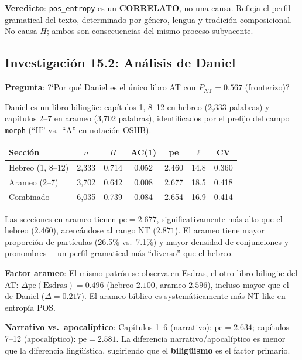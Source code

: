 \documentclass[12pt,a4paper]{article}
\begin{document}
\textbf{Veredicto}: \texttt{pos\_entropy} es un \textbf{CORRELATO}, no una causa.
Refleja el perfil gramatical del texto, determinado por g\'enero, lengua y tradici\'on
composicional. No causa $H$; ambos son consecuencias del mismo proceso subyacente.

\subsection{Investigaci\'on 15.2: An\'alisis de Daniel}

\textbf{Pregunta}: ?`Por qu\'e Daniel es el \'unico libro AT con $P_{\text{AT}} = 0.567$
(fronterizo)?

Daniel es un libro biling\"ue: cap\'itulos 1, 8--12 en hebreo (2,333 palabras)
y cap\'itulos 2--7 en arameo (3,702 palabras), identificados por el prefijo del campo
\texttt{morph} (``H'' vs.\ ``A'' en notaci\'on OSHB).

\begin{center}
\begin{tabular}{lcccccc}
\toprule
\textbf{Secci\'on} & $n$ & $H$ & AC(1) & pe & $\bar{\ell}$ & CV \\
\midrule
Hebreo (1, 8--12) & 2,333 & 0.714 & 0.052 & 2.460 & 14.8 & 0.360 \\
Arameo (2--7)     & 3,702 & 0.642 & 0.008 & 2.677 & 18.5 & 0.418 \\
Combinado         & 6,035 & 0.739 & 0.084 & 2.654 & 16.9 & 0.414 \\
\bottomrule
\end{tabular}
\end{center}

\noindent
Las secciones en arameo tienen $\text{pe} = 2.677$, significativamente m\'as alto
que el hebreo ($2.460$), acerc\'andose al rango NT ($2.871$). El arameo tiene
mayor proporci\'on de part\'iculas (26.5\% vs.\ 7.1\%) y mayor densidad de
conjunciones y pronombres ---un perfil gramatical m\'as ``diverso'' que el hebreo.

\textbf{Factor arameo}: El mismo patr\'on se observa en Esdras, el otro libro
biling\"ue del AT: $\Delta\text{pe}(\text{Esdras}) = 0.496$ (hebreo $2.100$,
arameo $2.596$), incluso mayor que el de Daniel ($\Delta = 0.217$).
El arameo b\'iblico es system\'aticamente m\'as NT-like en entrop\'ia POS.

\textbf{Narrativo vs.\ apocal\'iptico}: Cap\'itulos 1--6 (narrativo): $\text{pe} = 2.634$;
cap\'itulos 7--12 (apocal\'iptico): $\text{pe} = 2.581$. La diferencia narrativo/apocal\'iptico
es menor que la diferencia ling\"u\'istica, sugiriendo que el \textbf{bilig\"uismo}
es el factor primario.
\end{document}
